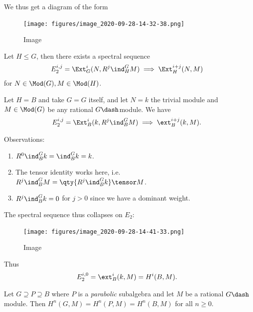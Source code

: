 We thus get a diagram of the form

\begin{figure}
\centering
\texttt{[image: figures/image\_2020-09-28-14-32-38.png]}
\caption{Image}
\end{figure}

\begin{proposition}[?]

Let \(H\leq G\), then there exists a spectral sequence
\begin{align*}  
E^{i, j}_2 = \Ext_G^i(N, R^j \ind_H^G M) \implies \Ext_H^{i+j}(N, M)
\end{align*} for \(N\in \Mod(G), M\in \Mod(H)\).

\end{proposition}

\begin{example}

Let \(H=B\) and take \(G=G\) itself, and let \(N = k\) the trivial
module and \(M\in \Mod(G)\) be any rational \(G\dash\)module. We have
\begin{align*}  
E_2^{i, j} = \Ext^{i}_B(k, R^j \ind_B^G M) \implies \ext^{i+j}_B(k, M)
.\end{align*}

Observations:

\begin{enumerate}
\def\labelenumi{\arabic{enumi}.}
\setcounter{enumi}{-1}
\item
  \(R^0 \ind_B^G k = \ind_B^G k = k\).
\item
  The tensor identity works here,
  i.e.~\(R^j \ind_B^G M = \qty{R^j \ind_B^G k} \tensor M\).
\item
  \(R^j \ind_B^G k = 0\) for \(j> 0\) since we have a dominant weight.
\end{enumerate}

The spectral sequence thus collapses on \(E_2\):

\begin{figure}
\centering
\texttt{[image: figures/image\_2020-09-28-14-41-33.png]}
\caption{Image}
\end{figure}

Thus
\begin{align*}  
E_2^{i, 0} = \ext^i_B(k, M) = H^i(B, M)
.\end{align*}

\end{example}

\begin{corollary}[?]

Let \(G \supseteq P \supseteq B\) where \(P\) is a \emph{parabolic}
subalgebra and let \(M\) be a rational \(G\dash\)module. Then
\(H^n(G, M) = H^n(P, M) = H^n(B, M)\) for all \(n \geq 0\).

\end{corollary}

